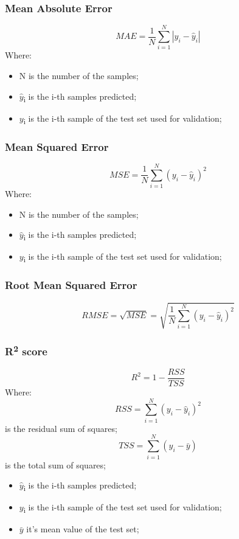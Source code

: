 \subsubsection{Mean Absolute Error}
\begin{equation}
MAE = \frac{1}{N}\sum_{i=1}^{N}|y_i-\hat{y}_i|
\end{equation}
Where:
\begin{itemize}
    \item N is the number of the samples;
    \item $\hat{y}$\textsubscript{i} is the i-th samples predicted;
    \item $y$\textsubscript{i} is the i-th sample of the test set used for validation;
\end{itemize}
\subsubsection{Mean Squared Error}
\begin{equation}
MSE = \frac{1}{N}\sum_{i=1}^{N}(y_i-\hat{y}_i)^2
\end{equation}
Where:
\begin{itemize}
    \item N is the number of the samples;
    \item $\hat{y}$\textsubscript{i} is the i-th samples predicted;
    \item $y$\textsubscript{i} is the i-th sample of the test set used for validation;
\end{itemize}
\subsubsection{Root Mean Squared Error}
\begin{equation}
RMSE = \sqrt{MSE}= \sqrt{\frac{1}{N}\sum_{i=1}^{N}(y_i-\hat{y}_i)^2}
\end{equation}
\subsubsection{R\textsuperscript{2} score}
\begin{equation}
R^2 = 1 - \frac{RSS}{TSS}    
\end{equation}
Where:
\begin{equation}RSS = \sum_{i=1}^{N}(y_i-\hat{y}_i)^2 \end{equation}is the residual sum of squares;
\begin{equation} TSS =  \sum_{i=1}^{N}(y_i-\bar{y})\end{equation} is the total sum of squares;
\begin{itemize}
    \item $\hat{y}$\textsubscript{i} is the i-th samples predicted;
    \item $y$\textsubscript{i} is the i-th sample of the test set used for validation;
    \item $\bar{y}$ it's mean value of the test set;
\end{itemize}

